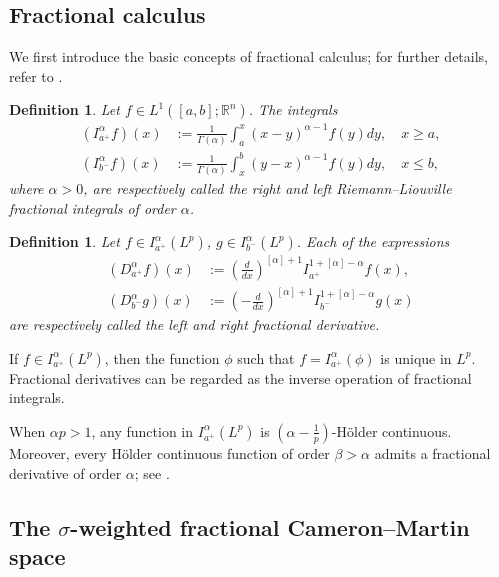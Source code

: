 \documentclass[preprint,12pt]{elsarticle}
\newtheorem{definition}[theorem]{Definition}
\theoremstyle{definition}
\theoremstyle{plain}
\begin{document}
\subsection{Fractional calculus}

We first introduce the basic concepts of fractional calculus; for further details, refer to \cite{Samko1993}.
 \begin{definition}
   	Let $f\in L^1([a,b];\mathbb{R}^n)$. The integrals 
   	\begin{align*}
   		(I_{a^+}^\alpha f)(x)&:=\frac{1}{\Gamma(\alpha)}\int_a^x (x-y)^{\alpha-1}f(y)dy,\quad x\geq a,\\
   		(I_{b^-}^\alpha f)(x)&:=\frac{1}{\Gamma(\alpha)}\int_x^b (y-x)^{\alpha-1}f(y)dy,\quad x\leq b,
   	\end{align*}
   	where $\alpha>0$, are respectively called the right and left Riemann--Liouville fractional integrals of order $\alpha$.

   \end{definition}
   
   
   
   
   	
   	\begin{definition}
   		 Let $f\in I_{a^+}^\alpha(L^p) $, $g\in I_{b^-}^\alpha(L^p) $.
   		 Each of the expressions 
   		 \begin{align*}
   		(D_{a^+}^\alpha f)(x)&:=\left(\frac{d}{dx} \right)^{[\alpha]+1}I_{a^+}^{1+[\alpha]-\alpha}f(x),\\
   		(D_{b^-}^\alpha g)(x)&:=\left(-\frac{d}{dx} \right)^{[\alpha]+1}I_{b^-}^{1+[\alpha]-\alpha}g(x)
   	   	\end{align*}
   		 are respectively called the left and right fractional derivative.
   \end{definition}

   
	If $f\in I_{a^+}^\alpha(L^p) $, then the function $ \phi $ such that $f=I_{a^+}^\alpha(\phi)$ is unique in $L^p $. Fractional derivatives can be regarded as the inverse operation of fractional integrals.
 
 When $\alpha p > 1$, any function in $I_{a^+}^\alpha(L^p)$ is 
$(\alpha - \tfrac{1}{p})$-H\"older continuous. Moreover, every H\"older continuous 
function of order $\beta > \alpha$ admits a fractional derivative of order 
$\alpha$; see \cite[Proposition~2.1]{Decreusefond1999}.


 
  	\subsection{The \texorpdfstring{$\sigma$}{sigma}-weighted fractional
Cameron--Martin space}
\end{document}
